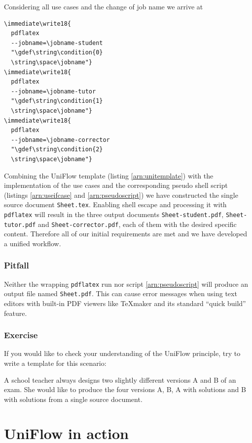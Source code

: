 \documentclass{maps}
\begin{document}
Considering all use cases and the change of job name we arrive at
\begin{lstlisting}[language={[LaTeX]TeX}, style=arn:lst, caption={Pseudo shell script in \LaTeX{}}, label=arn:pseudoscript]
\immediate\write18{
  pdflatex
  --jobname=\jobname-student
  "\gdef\string\condition{0}
  \string\space\jobname"}
\immediate\write18{
  pdflatex
  --jobname=\jobname-tutor
  "\gdef\string\condition{1}
  \string\space\jobname"}
\immediate\write18{
  pdflatex
  --jobname=\jobname-corrector
  "\gdef\string\condition{2}
  \string\space\jobname"}
\end{lstlisting}

Combining the UniFlow template (listing \ref{arn:unitemplate}) with the implementation of the use cases and the corresponding pseudo shell script (listings \ref{arn:useifcase} and \ref{arn:pseudoscript}) we have constructed the single source document \texttt{Sheet.tex}. Enabling shell escape and processing it with \texttt{pdflatex} will result in the three output documents \texttt{Sheet-student.pdf}, \texttt{Sheet-tutor.pdf} and \texttt{Sheet-corrector.pdf}, each of them with the desired specific content. Therefore all of our initial requirements are met and we have developed a unified workflow.

\subsubsection{Pitfall}
Neither the wrapping \texttt{pdflatex} run nor script \ref{arn:pseudoscript} will produce an output file named \texttt{Sheet.pdf}. This can cause error messages when using text editors with built-in PDF viewers like \TeX{}maker and its standard \enquote{quick build} feature.

\subsubsection{Exercise}
If you would like to check your understanding of the UniFlow principle,
try to write a template for this scenario:

A school teacher always designs two slightly different versions A and B of an exam.
She would like to produce the four versions A, B, A with solutions and B with solutions
from a single source document.

\newpage

\section{UniFlow in action}
\end{document}
